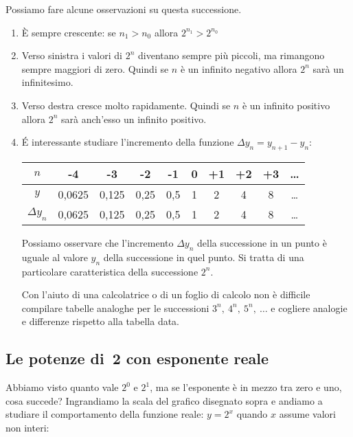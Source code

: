 \begin{osservazione}
Possiamo fare alcune osservazioni su questa successione.

\begin{enumerate}
 \item 
  È sempre crescente: se \(n_1 > n_0\) allora \(2^{n_1} > 2^{n_0}\)
 \item 
  Verso sinistra i valori di \(2^n\) diventano sempre più piccoli, ma 
rimangono 
  sempre maggiori di zero. Quindi se \(n\) è un infinito negativo 
  allora \(2^n\) sarà un infinitesimo.
 \item 
  Verso destra cresce molto rapidamente. Quindi se \(n\) è un infinito 
positivo 
  allora \(2^n\) sarà anch'esso un infinito positivo.
 \item 
  \'E interessante studiare l'incremento della funzione \;\(\Delta y_n = 
y_{n+1}-y_n\):
\begin{center}
\renewcommand\arraystretch{1.8}
\begin{tabular}{c|ccccccccc}
\(n\) & -4    & -3    & -2   & -1  & 0 & +1 & +2 & +3  & \dots \\
\hline 
\(y\) & 0,0625 & 0,125 & 0,25 & 0,5 & 1 & 2  & 4  & 8 & \dots\\
\hline
\(\Delta y_n\) & 
  0,0625 & 0,125 & 0,25 & 0,5 & 1 & 2  & 4  & 8& \dots \\
\end{tabular}
\end{center}

  Possiamo osservare che l'incremento \(\Delta y_n\) della successione  
in un punto è uguale al valore \(y_n\) della successione in quel punto. Si 
tratta di una particolare caratteristica della successione \(2^n\).

Con l'aiuto di una calcolatrice o di un foglio di calcolo non è difficile 
compilare tabelle analoghe per le successioni \(3^n,\ 4^n,\ 5^n,\ \dots\) e 
cogliere analogie e differenze rispetto alla tabella data.

\end{enumerate}
\end{osservazione}

\subsection{Le potenze di~2 con esponente reale}
\label{subsec:esplog_potdue}

Abbiamo visto quanto vale \(2^0\) e \(2^1\), ma se l'esponente è in mezzo 
tra zero e uno, cosa succede? Ingrandiamo la scala del grafico disegnato 
sopra 
e andiamo a studiare il comportamento della funzione reale: \(y=2^x\) 
quando 
\(x\) assume valori non interi:

